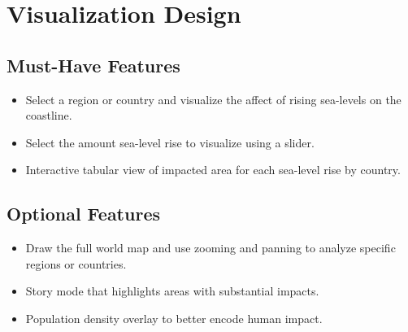 \documentclass[12pt]{article}
\begin{document}
	\section{Visualization Design}
		\subsection{Must-Have Features}
			\begin{itemize}
				\item
					Select a region or country and visualize the affect of rising sea-levels on the coastline.

				\item
					Select the amount sea-level rise to visualize using a slider.

				\item
					Interactive tabular view of impacted area for each sea-level rise by country.
			\end{itemize}

		\subsection{Optional Features}
			\begin{itemize}
				\item
					Draw the full world map and use zooming and panning to analyze specific regions or countries.

				\item
					Story mode that highlights areas with substantial impacts.

				\item
					Population density overlay to better encode human impact.
			\end{itemize}
\end{document}
